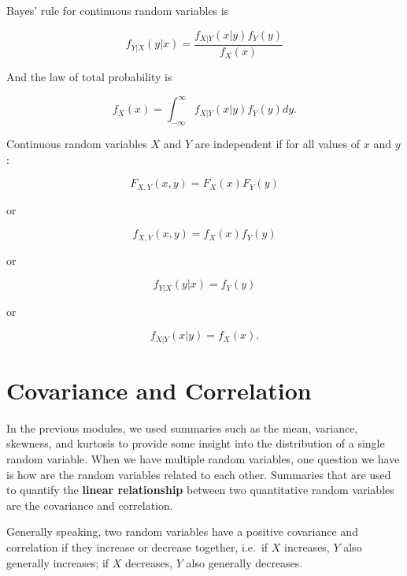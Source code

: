 \documentclass[
]{book}
\begin{document}
Bayes' rule for continuous random variables is

\begin{equation} 
f_{Y|X}(y|x) = \frac{f_{X|Y}(x|y) f_Y(y)}{f_X(x)}
\label{eq:5-condPDFbayes}
\end{equation}

And the law of total probability is

\begin{equation} 
f_X(x) = \int_{-\infty}^\infty f_{X|Y}(x|y) f_Y(y) dy.
\label{eq:5-condPDFtotal}
\end{equation}

Continuous random variables \(X\) and \(Y\) are independent if for all values of \(x\) and \(y\):

\begin{equation} 
F_{X,Y} (x,y) = F_X(x) F_Y(y)
\label{eq:5-indcont1}
\end{equation}

or

\begin{equation} 
f_{X,Y} (x,y) = f_X(x) f_Y(y)
\label{eq:5-indcont2}
\end{equation}

or

\begin{equation} 
f_{Y|X} (y|x) = f_Y(y)
\label{eq:5-indcont3}
\end{equation}

or

\begin{equation} 
f_{X|Y} (x|y) = f_X(x).
\label{eq:5-indcont4}
\end{equation}

\section{Covariance and Correlation}\label{covariance-and-correlation}

In the previous modules, we used summaries such as the mean, variance, skewness, and kurtosis to provide some insight into the distribution of a single random variable. When we have multiple random variables, one question we have is how are the random variables related to each other. Summaries that are used to quantify the \textbf{linear relationship} between two quantitative random variables are the covariance and correlation.

Generally speaking, two random variables have a positive covariance and correlation if they increase or decrease together, i.e.~if \(X\) increases, \(Y\) also generally increases; if \(X\) decreases, \(Y\) also generally decreases.
\end{document}
